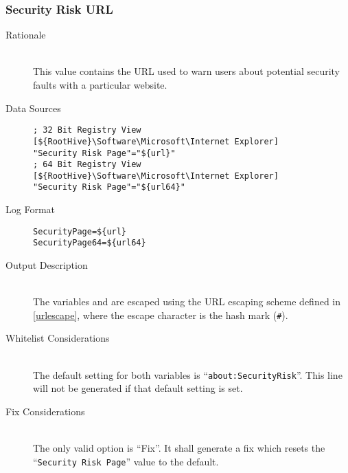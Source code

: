 \subsubsection{Security Risk URL}
\begin{description}
\item[Rationale]  \hfill \\ This value contains the URL used to warn users about
potential security faults with a particular website.

\item[Data Sources] \hfill
\vspace{-\baselineskip}
\begin{verbatim}
; 32 Bit Registry View
[${RootHive}\Software\Microsoft\Internet Explorer]
"Security Risk Page"="${url}"
; 64 Bit Registry View
[${RootHive}\Software\Microsoft\Internet Explorer]
"Security Risk Page"="${url64}"
\end{verbatim}
\item[Log Format] \hfill
\vspace{-\baselineskip}
\begin{verbatim} 
SecurityPage=${url}
SecurityPage64=${url64}
\end{verbatim}
\item[Output Description] \hfill \\
The variables  and  are escaped using the URL escaping
scheme defined in \ref{urlescape}, where the escape character is the hash mark
(\verb|#|).
\item[Whitelist Considerations] \hfill \\
The default setting for both variables is ``\verb|about:SecurityRisk|''. This
line will not be generated if that default setting is set.
\item[Fix Considerations] \hfill \\
The only valid option is ``Fix''. It shall generate a fix which resets the
``\verb|Security Risk Page|'' value to the default.
\end{description}

